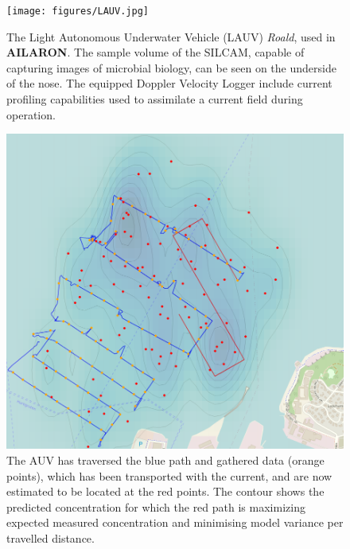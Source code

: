 \documentclass[conference]{IEEEtran}
\def\proje{{\textbf{AILARON}}}
\begin{document}
\begin{figure}[tbp]
  \centering
  \texttt{[image: figures/LAUV.jpg]}
  \caption{The Light Autonomous Underwater Vehicle (LAUV)
    \emph{Roald}, used in \proje. The sample volume of the SILCAM,
    capable of capturing images of microbial biology, can be seen on
    the underside of the nose. The equipped Doppler Velocity Logger
    include current profiling capabilities used to assimilate a
    current field during operation.}
  \label{fig:roald}
\end{figure}

\begin{figure}[tbp]
  \centering
  \includegraphics[width=\linewidth]{figures/munkholmen_planned_path.png}
  \caption{The AUV has traversed the blue path and gathered data (orange
    points), which has been transported with the current, and are now
    estimated to be located at the red points.  The contour shows the
    predicted concentration for which the red path is maximizing
    expected measured concentration and minimising model variance per travelled distance.}
  \label{fig:munkholmen}
\end{figure}





\end{document}
